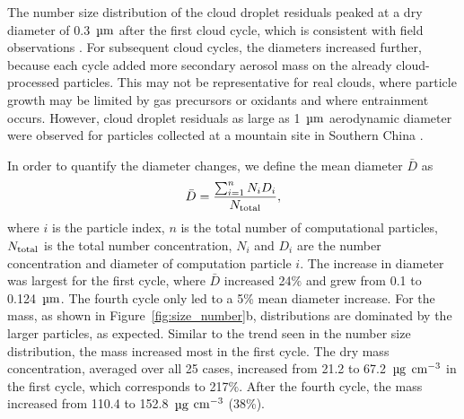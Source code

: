 \documentclass[edeposit,fullpage]{uiucthesis2009}
\begin{document}
The number size distribution of the cloud droplet residuals
  peaked at a dry diameter of 0.3~$\rm \mu m$ after the first cloud
  cycle, which is consistent with field observations
  \citep{fast2019impact, ditas2012aerosols, ge2012effect}. For
  subsequent cloud cycles, the diameters increased further, because
  each cycle added more secondary aerosol mass on the already
  cloud-processed particles. This may not be representative for real
  clouds, where particle growth may be limited by gas precursors or
  oxidants and where entrainment occurs. However, cloud droplet
  residuals as large as 1~$\rm \mu m$ aerodynamic diameter were
  observed for particles collected at a mountain site in Southern
  China \citep{lin2017situ}.

In order to quantify the diameter changes, we define the mean diameter
$\bar{D}$ as
\begin{equation}
	\bar{D}=\frac{\sum_{i=1}^{n} N_i D_i}{N_{\rm total}},
\end{equation}
where $i$ is the particle index, $n$ is the total number of computational
particles, $N_{\rm total}$ is the total number concentration, $N_i$
and $D_i$ are the number concentration and diameter of computation
particle $i$. The increase in diameter was largest for the first
cycle, where $\bar{D}$ increased 24$\%$ and grew from 0.1 to
0.124~$\rm \mu m$. The fourth cycle only led to a 5\% mean diameter
increase. For the mass, as shown in Figure~\ref{fig:size_number}b,
distributions are dominated by the larger particles, as
expected. Similar to the trend seen in the number size distribution,
the mass increased most in the first cycle. The dry mass
  concentration, averaged over all 25 cases, increased from 21.2 to
  67.2~$\rm \mu g$ $\rm cm^{-3}$ in the first cycle, which corresponds
  to 217$\%$. After the fourth cycle, the mass increased from 110.4 to
  152.8~$\rm \mu g$ $\rm cm^{-3}$ (38\%).
\end{document}
